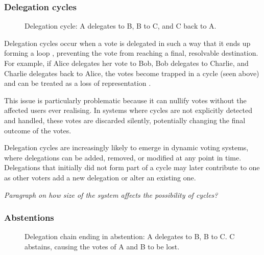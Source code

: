 \subsubsection{Delegation cycles}
\begin{figure}[h]
    \centering
    \caption{Delegation cycle: A delegates to B, B to C, and C back to A.}
    \label{fig:triangle-cycle}
\end{figure}


Delegation cycles occur when a vote is delegated in such a way that it ends up forming a loop \citep{brill_liquid_2022}, preventing the vote from reaching a final, resolvable destination. For example, if Alice delegates her vote to Bob, Bob delegates to Charlie, and Charlie delegates back to Alice, the votes become trapped in a cycle (seen above) and can be treated as a loss of representation \citep{christoff2017liquiddemocracyanalysisbinary}.

This issue is particularly problematic because it can nullify votes without the affected users ever realising. In systems where cycles are not explicitly detected and handled, these votes are discarded silently, potentially changing the final outcome of the votes.

Delegation cycles are increasingly likely to emerge in dynamic voting systems, where delegations can be added, removed, or modified at any point in time. Delegations that initially did not form part of a cycle may later contribute to one as other voters add a new delegation or alter an existing one.

\textit{Paragraph on how size of the system affects the possibility of cycles?}

\subsubsection{Abstentions}
\begin{figure}[h]
    \centering
    \caption{Delegation chain ending in abstention: A delegates to B, B to C. C abstains, causing the votes of A and B to be lost.}
    \label{fig:delegation-abstention}
\end{figure}

